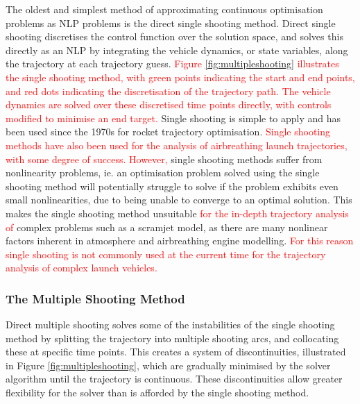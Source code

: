 The oldest and simplest method of approximating continuous optimisation problems as NLP problems is the direct single shooting method. Direct single shooting discretises the control function over the solution space, and solves this directly as an NLP by integrating the vehicle dynamics, or state variables, along the trajectory at each trajectory guess\cite{Betts1998,Kelly2015,Rao2009,Fasano2013}. \textcolor{red}{Figure \ref{fig:multipleshooting} illustrates the single shooting method, with green points indicating the start and end points, and red dots indicating the discretisation of the trajectory path. The vehicle dynamics are solved over these discretised time points directly, with controls modified to minimise an end target.} Single shooting is simple to apply and has been used since the 1970s for rocket trajectory optimisation\cite{jezewski1971}. \textcolor{red}{Single shooting methods have also been used for the analysis of airbreathing launch trajectories, with some degree of success\cite{Powell1991,Bradford2000,Hyperion,Bradford2002,Fujikawa2017}. However,} single shooting methods suffer from nonlinearity problems, ie. an optimisation problem solved using the single shooting method will potentially struggle to solve if the problem exhibits even small nonlinearities, due to being unable to converge to an optimal solution. This makes the single shooting method unsuitable \textcolor{red}{for the in-depth trajectory analysis of} complex problems such as a scramjet model, as there are many nonlinear factors inherent in atmosphere and airbreathing engine modelling. \textcolor{red}{For this reason single shooting is not commonly used at the current time for the trajectory analysis of complex launch vehicles.}


\subsubsection{The Multiple Shooting Method}

Direct multiple shooting solves some of the instabilities of the single shooting method by splitting the trajectory into multiple shooting arcs, and collocating these at specific time points\cite{Betts1998,Kelly2015,Rao2009,Fasano2013}. This creates a system of discontinuities, illustrated in Figure \ref{fig:multipleshooting}, which are gradually minimised by the solver algorithm until the trajectory is continuous. These discontinuities allow greater flexibility for the solver than is afforded by the single shooting method. 

